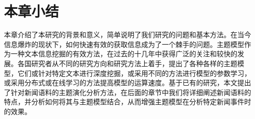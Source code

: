 \section{本章小结}
本章介绍了本研究的背景和意义，简单说明了我们研究的问题和基本方法。在当今信息爆炸的现状下，如何快速有效的获取信息成为了一个棘手的问题。主题模型作为一种文本信息挖掘的有效方法，在过去的十几年中获得广泛的关注和较快的发展。各国研究者从不同的研究方向和研究方法上着手，提出了各种各样的主题模型，它们或针对特定文本进行深度挖掘，或采用不同的方法进行模型的参数学习，或采用分布式或在线学习的方法提高模型的运算速度。基于已有的研究，本文提出了针对新闻语料的主题演化分析方法，在后面的章节中我们将详细阐述新闻语料的特点，并分析如何将其与主题模型结合，从而增强主题模型在分析特定新闻事件时的效果。


